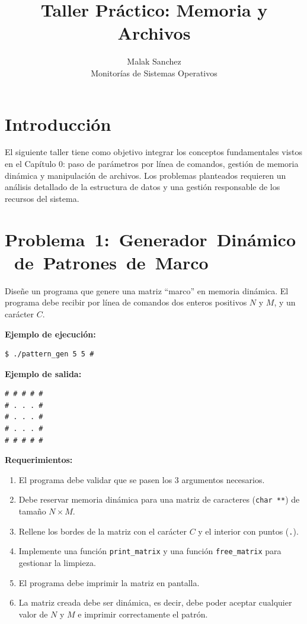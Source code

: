 \documentclass[12pt,a4paper]{article}
\title{\textbf{Taller Práctico: Memoria y Archivos}}
\author{Malak Sanchez \\ \small Monitorías de Sistemas Operativos}
\date{}
\begin{document}
\maketitle

\section*{Introducción}
El siguiente taller tiene como objetivo integrar los conceptos fundamentales vistos en el Capítulo 0: paso de parámetros por línea de comandos, gestión de memoria dinámica y manipulación de archivos. Los problemas planteados requieren un análisis detallado de la estructura de datos y una gestión responsable de los recursos del sistema.

\section*{\mbox{Problema 1: Generador Dinámico de Patrones de Marco}}
Diseñe un programa que genere una matriz ``marco'' en memoria dinámica. El programa debe recibir por línea de comandos dos enteros positivos $N$ y $M$, y un carácter $C$.

\textbf{Ejemplo de ejecución:} 
\begin{lstlisting}[numbers=none]
$ ./pattern_gen 5 5 #
\end{lstlisting}

\textbf{Ejemplo de salida:}
\begin{lstlisting}[numbers=none]
# # # # #
# . . . #
# . . . #
# . . . #
# # # # #
\end{lstlisting}

\textbf{Requerimientos:}
\begin{enumerate}
    \item El programa debe validar que se pasen los 3 argumentos necesarios.
    \item Debe reservar memoria dinámica para una matriz de caracteres (\texttt{char **}) de tamaño $N \times M$.
    \item Rellene los bordes de la matriz con el carácter $C$ y el interior con puntos (\texttt{.}).
    \item Implemente una función \texttt{print\_matrix} y una función \texttt{free\_matrix} para gestionar la limpieza.
    \item El programa debe imprimir la matriz en pantalla.
    \item La matriz creada debe ser dinámica, es decir, debe poder aceptar cualquier valor de $N$ y $M$ e imprimir correctamente el patrón.
\end{enumerate}
\end{document}
